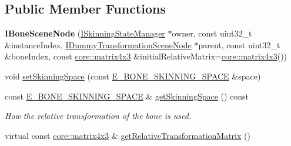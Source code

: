 \subsection*{Public Member Functions}
\begin{DoxyCompactItemize}
\item 
{\bfseries I\+Bone\+Scene\+Node} (\hyperlink{classirr_1_1scene_1_1ISkinningStateManager}{I\+Skinning\+State\+Manager} $\ast$owner, const uint32\+\_\+t \&instance\+Index, \hyperlink{classirr_1_1scene_1_1IDummyTransformationSceneNode}{I\+Dummy\+Transformation\+Scene\+Node} $\ast$parent, const uint32\+\_\+t \&bone\+Index, const \hyperlink{classirr_1_1core_1_1matrix4x3}{core\+::matrix4x3} \&initial\+Relative\+Matrix=\hyperlink{classirr_1_1core_1_1matrix4x3}{core\+::matrix4x3}())\hypertarget{classirr_1_1scene_1_1ISkinningStateManager_1_1IBoneSceneNode_abddb29366296038e2220227c40409977}{}\label{classirr_1_1scene_1_1ISkinningStateManager_1_1IBoneSceneNode_abddb29366296038e2220227c40409977}

\item 
void \hyperlink{classirr_1_1scene_1_1ISkinningStateManager_1_1IBoneSceneNode_af55d36fe96f9e41c994648f1950db450}{set\+Skinning\+Space} (const \hyperlink{classirr_1_1scene_1_1ISkinningStateManager_1_1IBoneSceneNode_a746e46bb30372063ca11a4695fd345bd}{E\+\_\+\+B\+O\+N\+E\+\_\+\+S\+K\+I\+N\+N\+I\+N\+G\+\_\+\+S\+P\+A\+CE} \&space)
\item 
const \hyperlink{classirr_1_1scene_1_1ISkinningStateManager_1_1IBoneSceneNode_a746e46bb30372063ca11a4695fd345bd}{E\+\_\+\+B\+O\+N\+E\+\_\+\+S\+K\+I\+N\+N\+I\+N\+G\+\_\+\+S\+P\+A\+CE} \& \hyperlink{classirr_1_1scene_1_1ISkinningStateManager_1_1IBoneSceneNode_af9670516d5c70ed4bc2ac0e87912a6fc}{get\+Skinning\+Space} () const \hypertarget{classirr_1_1scene_1_1ISkinningStateManager_1_1IBoneSceneNode_af9670516d5c70ed4bc2ac0e87912a6fc}{}\label{classirr_1_1scene_1_1ISkinningStateManager_1_1IBoneSceneNode_af9670516d5c70ed4bc2ac0e87912a6fc}

\begin{DoxyCompactList}\small\item\em How the relative transformation of the bone is used. \end{DoxyCompactList}\item 
virtual const \hyperlink{classirr_1_1core_1_1matrix4x3}{core\+::matrix4x3} \& \hyperlink{classirr_1_1scene_1_1ISkinningStateManager_1_1IBoneSceneNode_aa01aed4ed2c55c61449ee38c98583fd4}{get\+Relative\+Transformation\+Matrix} ()\hypertarget{classirr_1_1scene_1_1ISkinningStateManager_1_1IBoneSceneNode_aa01aed4ed2c55c61449ee38c98583fd4}{}\label{classirr_1_1scene_1_1ISkinningStateManager_1_1IBoneSceneNode_aa01aed4ed2c55c61449ee38c98583fd4}


\end{DoxyCompactItemize}
